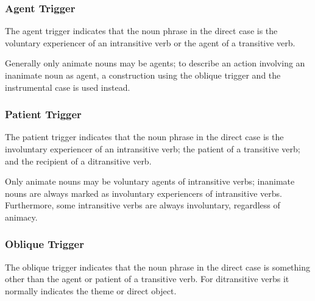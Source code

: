 \documentclass[grammar]{subfiles}
\begin{document}

  \subsubsection{Agent Trigger}
  \label{sssec:vm_agt_trigger}

  The agent trigger indicates that the noun phrase in the direct case is the
  voluntary experiencer of an intransitive verb or the agent of a transitive
  verb.
  
  Generally only animate nouns may be agents; to describe an action
  involving an inanimate noun as agent, a construction using the oblique trigger
  and the instrumental case is used instead. 

  \subsubsection{Patient Trigger}
  \label{sssec:vm_pat_trigger}

  The patient trigger indicates that the noun phrase in the direct case is the
  involuntary experiencer of an intransitive verb; the patient of a transitive
  verb; and the recipient of a ditransitive verb.  
  
  Only animate nouns may be voluntary agents of intransitive verbs; inanimate
  nouns are always marked as involuntary experiencers of intransitive verbs.
  Furthermore, some intransitive verbs are always involuntary, regardless of animacy. 

  \subsubsection{Oblique Trigger}
  \label{sssec:vm_obl_trigger}

  The oblique trigger indicates that the noun phrase in the direct case is something
  other than the agent or patient of a transitive verb.  For ditransitive verbs
  it normally indicates the theme or direct object.
\end{document}
